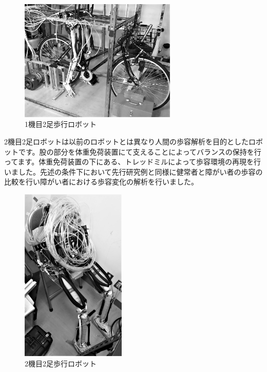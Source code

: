 \documentclass[a4paper,twocolumn]{jsarticle}
\begin{document}
    \begin{figure}[H]
        \centering
        \includegraphics[width=7.5cm]{1st.jpg}
        \caption{1機目2足歩行ロボット}
    \end{figure}
    
    2機目2足ロボットは以前のロボットとは異なり人間の歩容解析を目的としたロボットです。股の部分を体重免荷装置にて支えることによってバランスの保持を行ってます。体重免荷装置の下にある、トレッドミルによって歩容環境の再現を行いました。先述の条件下において先行研究例と同様に健常者と障がい者の歩容の比較を行い障がい者における歩容変化の解析を行いました。

    \begin{figure}[H]
        \centering
        \includegraphics[width=5cm]{2nd.jpg}
        \caption{2機目2足歩行ロボット}
    \end{figure} %
\end{document}
